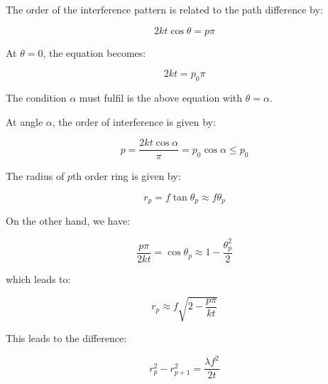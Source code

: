 \documentclass[12pt]{article}
\begin{document}



\pagebreak
\section*{}





The order of the interference pattern is related to the path difference by:

\begin{equation}
    2kt\cos{\theta} = p \pi
\end{equation}

At $\theta = 0$, the equation becomes:

\begin{equation}
    2kt = p_{0} \pi
\end{equation}

The condition $\alpha$ must fulfil is the above equation with $\theta = \alpha$.

At angle $\alpha$, the order of interference is given by:

\begin{equation}
    p = \frac{2kt\cos{\alpha}}{\pi} = p_{0} \cos{\alpha} \le p_{0}
\end{equation}

The radius of $p$th order ring is given by:

\begin{equation}
    r_{p} = f \tan{\theta_{p}} \approx f \theta_{p}
\end{equation}

On the other hand, we have:

\begin{equation}
    \frac{p \pi}{2kt} = \cos{\theta_{p}} \approx 1 - \frac{\theta_{p}^{2}}{2}
\end{equation}

which leads to:

\begin{equation}
    r_{p} \approx f \sqrt{2 - \frac{p\pi}{kt}}
\end{equation}

This leads to the difference:

\begin{equation}
    r_{p}^{2} - r_{p+1}^{2} = \frac{\lambda f^{2}}{2t}
\end{equation}
\end{document}
